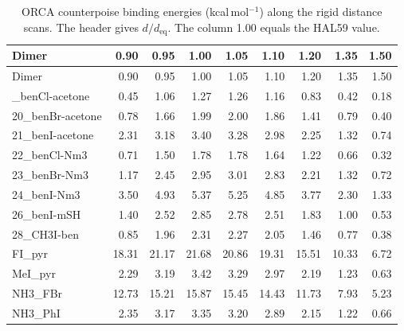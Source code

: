 {\scriptsize
\setlength{\tabcolsep}{3pt}
\begin{longtable}{lrrrrrrrr}
\caption{ORCA counterpoise binding energies (kcal\,mol$^{-1}$) along the rigid distance scans. The header gives $d/d_\mathrm{eq}$. The column 1.00 equals the HAL59 value.}\label{tab:cpdist}\\
\toprule
Dimer & 0.90 & 0.95 & 1.00 & 1.05 & 1.10 & 1.20 & 1.35 & 1.50\\
\midrule
\endfirsthead
\toprule
Dimer & 0.90 & 0.95 & 1.00 & 1.05 & 1.10 & 1.20 & 1.35 & 1.50\\
\midrule
\endhead
\bottomrule
\endlastfoot
19\_benCl-acetone & 0.45 & 1.06 & 1.27 & 1.26 & 1.16 & 0.83 & 0.42 & 0.18\\
20\_benBr-acetone & 0.78 & 1.66 & 1.99 & 2.00 & 1.86 & 1.41 & 0.79 & 0.40\\
21\_benI-acetone & 2.31 & 3.18 & 3.40 & 3.28 & 2.98 & 2.25 & 1.32 & 0.74\\
22\_benCl-Nm3 & 0.71 & 1.50 & 1.78 & 1.78 & 1.64 & 1.22 & 0.66 & 0.32\\
23\_benBr-Nm3 & 1.17 & 2.45 & 2.95 & 3.01 & 2.83 & 2.21 & 1.32 & 0.72\\
24\_benI-Nm3 & 3.50 & 4.93 & 5.37 & 5.25 & 4.85 & 3.77 & 2.30 & 1.33\\
26\_benI-mSH & 1.40 & 2.52 & 2.85 & 2.78 & 2.51 & 1.83 & 1.00 & 0.53\\
28\_CH3I-ben & 0.85 & 1.96 & 2.31 & 2.27 & 2.05 & 1.46 & 0.77 & 0.38\\
FI\_pyr & 18.31 & 21.17 & 21.68 & 20.86 & 19.31 & 15.51 & 10.33 & 6.72\\
MeI\_pyr & 2.29 & 3.19 & 3.42 & 3.29 & 2.97 & 2.19 & 1.23 & 0.63\\
NH3\_FBr & 12.73 & 15.21 & 15.87 & 15.45 & 14.43 & 11.73 & 7.93 & 5.23\\
NH3\_PhI & 2.35 & 3.17 & 3.35 & 3.20 & 2.89 & 2.15 & 1.22 & 0.66\\
\end{longtable}}
